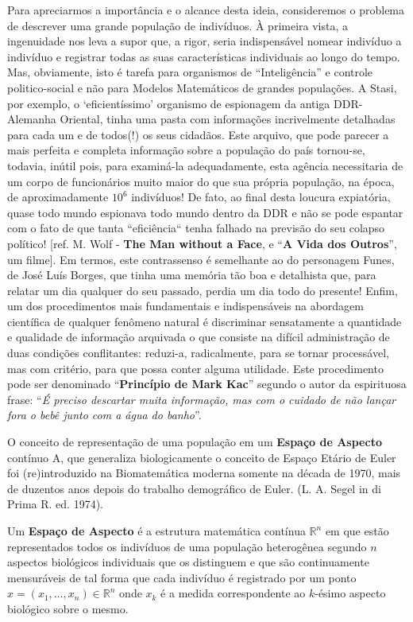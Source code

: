 {Para apreciarmos a importância e o alcance desta ideia, consideremos o problema de descrever uma grande população de indivíduos. À primeira vista, a ingenuidade nos leva a supor que, a rigor, seria indispensável nomear indivíduo a indivíduo e registrar todas as suas características individuais ao longo do tempo. Mas, obviamente, isto é tarefa para organismos de ``Inteligência'' e controle politico-social e não para Modelos Matemáticos de grandes populações. A Stasi, por exemplo, o `eficientíssimo' organismo de espionagem da antiga DDR-Alemanha Oriental, tinha uma pasta com informações incrivelmente detalhadas para cada um e de todos(!) os seus cidadãos. Este arquivo, que pode parecer a mais perfeita e completa informação sobre a população do país tornou-se, todavia, inútil pois, para examiná-la adequadamente, esta agência necessitaria de um corpo de funcionários muito maior do que sua própria população, na época, de aproximadamente \(10^6\) indivíduos! De fato, ao final desta loucura expiatória, quase todo mundo espionava todo mundo dentro da DDR e não se pode espantar com o fato de que tanta ``eficiência`` tenha falhado na previsão do seu colapso político! [ref. M. Wolf - \textbf{The Man without a Face}, e ``\textbf{A Vida dos Outros}'', um filme]. Em termos, este contrassenso é semelhante ao do personagem Funes, de José Luís Borges, que tinha uma memória tão boa e detalhista que, para relatar um dia qualquer do seu passado, perdia um dia todo do presente! Enfim, um dos procedimentos mais fundamentais e indispensáveis na abordagem científica de qualquer fenômeno natural é discriminar sensatamente a quantidade e qualidade de informação arquivada o que consiste na difícil administração de duas condições conflitantes: reduzi-a, radicalmente, para se tornar processável, mas com critério, para que possa conter alguma utilidade. Este procedimento pode ser denominado ``\textbf{Princípio de Mark Kac}'' segundo o autor da espirituosa frase: ``\textit{É preciso descartar muita informação, mas com o cuidado de não lançar fora o bebê junto com a água do banho}''.
}

O conceito de representação de uma população em um \textbf{Espaço de Aspecto} contínuo A, que generaliza biologicamente o conceito de Espaço Etário de Euler foi (re)introduzido na Biomatemática moderna somente na década de 1970, mais de duzentos anos depois do trabalho demográfico de Euler. (L. A. Segel in di Prima R. ed. 1974).

Um \textbf{Espaço de Aspecto} é a estrutura matemática contínua \(\mathbb{R}^{n}\) em que estão representados todos os indivíduos de uma população heterogênea segundo \(n\) aspectos biológicos individuais que os distinguem e que são continuamente mensuráveis de tal forma que cada indivíduo é registrado por um ponto \(x = (x_1, \ldots , x_n) \in \mathbb{R}^n\) onde \(x_k\) é a medida correspondente ao \(k\)-ésimo aspecto biológico sobre o mesmo.

